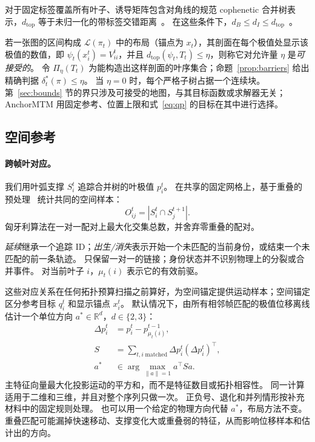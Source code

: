 \documentclass[fontset=none,zihao=5,a4paper]{ctexart}
\newcommand{\dtop}{d_{\mathrm{top}}}
\begin{document}
对于固定标签覆盖所有叶子、诱导矩阵包含对角线的规范 cophenetic 合并树表示，$\dtop$ 等于未归一化的带标签交错距离~\cite{Munch:2019:LINF,Gasparovic:2024:IID}。
在这些条件下，$d_B\le d_I\le\dtop$~\cite{Morozov:2013:IDMT}。

若一张图的区间构成 $\mathcal{L}(\pi_t)$ 中的布局（锚点为 $x_t$），其剖面在每个极值处显示该极值的数值，即 $\psi_t(x_i^t)=V_{ii}^t$，并且 $\dtop(\psi_t,T_t)\le\eta$，则称它对允许量 $\eta$ 是\emph{可接受的}。
令 $\Pi_\eta(T_t)$ 为能构造出这样剖面的叶序集合；命题~\ref{prop:barriers} 给出精确判据 $\delta_t^*(\pi)\le\eta$。
当 $\eta=0$ 时，每个严格子树占据一个连续块。
第~\ref{sec:bounds} 节的界只涉及可接受的地图，与其目标函数或求解器无关；AnchorMTM 用固定参考、位置上限和式~\ref{eq:qp} 的目标在其中进行选择。

\subsection{空间参考}\label{sec:reference}
\paragraph{跨帧叶对应。}
我们用叶弧支撑 $S_i^t$ 追踪合并树的叶极值 $p_i^t$。
在共享的固定网格上，基于重叠的预处理~\cite{STMTM:2026} 统计共同的空间样本：
\begin{equation}\label{eq:overlap}
 O_{ij}^t=|S_i^t\cap S_j^{t+1}|.
\end{equation}
匈牙利算法在一对一配对上最大化交集总数，并舍弃零重叠的配对。

\emph{延续}继承一个追踪 ID；\emph{出生/消失}表示开始一个未匹配的当前身份，或结束一个未匹配的前一条轨迹。
只保留一对一的链接；身份状态并不识别物理上的分裂或合并事件。
对当前叶子 $i$，$\mu_t(i)$ 表示它的有效前驱。

这些对应关系在任何拓扑预算扫描之前算好，为空间锚定提供运动样本；空间锚定区分参考目标 $q_i^t$ 和显示锚点 $x_i^t$。
默认情况下，由所有相邻帧匹配的极值位移离线估计一个单位方向 $a^*\in\mathbb{R}^d$，$d\in\{2,3\}$：
\begin{equation}\label{eq:autodirection}
\begin{aligned}
 \Delta p_i^t&=p_i^t-p_{\mu_t(i)}^{t-1},\\
 S&=\sum_{t,i\;\mathrm{matched}}\Delta p_i^t(\Delta p_i^t)^\top,\\
 a^*&\in\arg\max_{\|a\|=1}a^\top Sa.
\end{aligned}
\end{equation}
主特征向量最大化投影运动的平方和，而不是特征数目或拓扑相容性。
同一计算适用于二维和三维，并且对整个序列只做一次。
正负号、退化和并列情形按补充材料中的固定规则处理。
也可以用一个给定的物理方向代替 $a^*$，布局方法不变。
重叠匹配可能漏掉快速移动、支撑变化大或重叠弱的特征，从而影响位移样本和估计出的方向。
\end{document}
